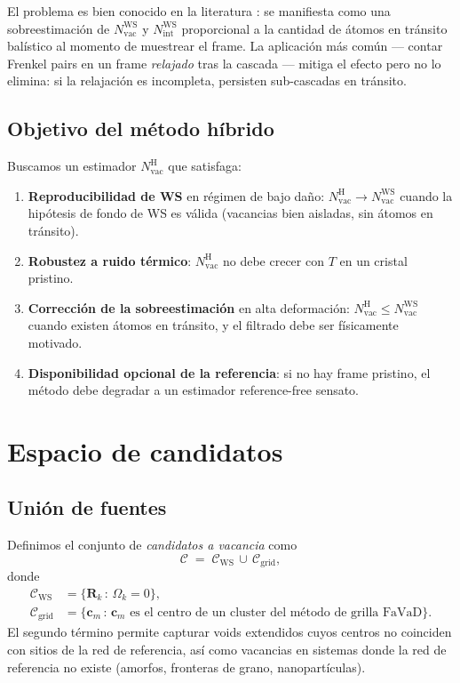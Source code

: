 \documentclass[11pt,a4paper]{article}
\theoremstyle{remark}
\begin{document}
El problema es bien conocido en la literatura
\cite{Stoller2000,Soneda2003,Granberg2016}: se manifiesta como una
sobreestimación de $N_\text{vac}^\text{WS}$ y $N_\text{int}^\text{WS}$
proporcional a la cantidad de átomos en tránsito balístico al momento de
muestrear el frame. La aplicación más común --- contar Frenkel pairs
en un frame \emph{relajado} tras la cascada --- mitiga el efecto pero
no lo elimina: si la relajación es incompleta, persisten sub-cascadas
en tránsito.

\subsection{Objetivo del método híbrido}

Buscamos un estimador $N_\text{vac}^\text{H}$ que satisfaga:
\begin{enumerate}[label=(\roman*)]
\item \textbf{Reproducibilidad de WS} en régimen de bajo daño:
      $N_\text{vac}^\text{H} \to N_\text{vac}^\text{WS}$ cuando la
      hipótesis de fondo de WS es válida (vacancias bien aisladas,
      sin átomos en tránsito).
\item \textbf{Robustez a ruido térmico}: $N_\text{vac}^\text{H}$ no
      debe crecer con $T$ en un cristal pristino.
\item \textbf{Corrección de la sobreestimación} en alta deformación:
      $N_\text{vac}^\text{H} \leq N_\text{vac}^\text{WS}$ cuando existen
      átomos en tránsito, y el filtrado debe ser físicamente motivado.
\item \textbf{Disponibilidad opcional de la referencia}: si no hay
      frame pristino, el método debe degradar a un estimador
      reference-free sensato.
\end{enumerate}

\section{Espacio de candidatos}

\subsection{Unión de fuentes}
\label{sec:candidates}

Definimos el conjunto de \emph{candidatos a vacancia} como
\begin{equation}
  \mathcal{C} \;=\; \mathcal{C}_\text{WS} \,\cup\, \mathcal{C}_\text{grid},
\end{equation}
donde
\begin{align}
  \mathcal{C}_\text{WS}   &= \{\mathbf{R}_k \,:\, \Omega_k = 0\},
  \\
  \mathcal{C}_\text{grid} &= \{\mathbf{c}_m \,:\, \mathbf{c}_m
    \text{ es el centro de un cluster del método de grilla FaVaD}\}.
\end{align}
El segundo término permite capturar voids extendidos cuyos centros no
coinciden con sitios de la red de referencia, así como vacancias en
sistemas donde la red de referencia no existe (amorfos, fronteras de
grano, nanopartículas).
\end{document}
